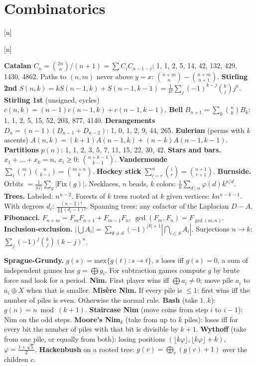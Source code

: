 \section{Combinatorics}

[n]

[n]

{\small
\textbf{Catalan} $C_n = \binom{2n}{n}/(n+1) = \sum C_i C_{n-1-i}$: 1, 1, 2, 5, 14, 42, 132, 429, 1430, 4862. Paths to $(n, m)$ never above $y = x$: $\binom{n+m}{n} - \binom{n+m}{n+1}$.
\textbf{Stirling 2nd} $S(n, k) = k S(n-1, k) + S(n-1, k-1) = \frac{1}{k!}\sum_j (-1)^{k-j}\binom{k}{j} j^n$. \textbf{Stirling 1st} (unsigned, cycles) $c(n, k) = (n-1)c(n-1, k) + c(n-1, k-1)$.
\textbf{Bell} $B_{n+1} = \sum_k \binom{n}{k} B_k$: 1, 1, 2, 5, 15, 52, 203, 877, 4140. \textbf{Derangements} $D_n = (n-1)(D_{n-1} + D_{n-2})$: 1, 0, 1, 2, 9, 44, 265.
\textbf{Eulerian} (perms with $k$ ascents) $A(n, k) = (k+1)A(n-1, k) + (n-k)A(n-1, k-1)$. \textbf{Partitions} $p(n)$: 1, 1, 2, 3, 5, 7, 11, 15, 22, 30, 42.
\textbf{Stars and bars.} $x_1 + \dots + x_k = n$, $x_i \ge 0$: $\binom{n+k-1}{k-1}$. \textbf{Vandermonde} $\sum_i \binom{m}{i}\binom{n}{k-i} = \binom{m+n}{k}$. \textbf{Hockey stick} $\sum_{i=r}^n \binom{i}{r} = \binom{n+1}{r+1}$.
\textbf{Burnside.} Orbits $= \frac{1}{|G|}\sum_g |\mathrm{Fix}(g)|$. Necklaces, $n$ beads, $k$ colors: $\frac{1}{n}\sum_{d \mid n}\varphi(d) k^{n/d}$.
\textbf{Trees.} Labeled: $n^{n-2}$. Forests of $k$ trees rooted at $k$ given vertices: $k n^{n-k-1}$. With degrees $d_i$: $\frac{(n-2)!}{\prod (d_i - 1)!}$. Spanning trees: any cofactor of the Laplacian $D - A$.
\textbf{Fibonacci.} $F_{n+m} = F_m F_{n+1} + F_{m-1} F_n$, $\gcd(F_m, F_n) = F_{\gcd(m, n)}$.
\textbf{Inclusion-exclusion.} $|\bigcup A_i| = \sum_{\emptyset \ne S} (-1)^{|S|+1} |\bigcap_{i \in S} A_i|$. Surjections $n \to k$: $\sum_j (-1)^j \binom{k}{j}(k-j)^n$.
\par}

{\small
\textbf{Sprague-Grundy.} $g(s) = \mathrm{mex}\{g(t) : s \to t\}$, $s$ loses iff $g(s) = 0$, a sum of independent games has $g = \bigoplus g_i$. For subtraction games compute $g$ by brute force and look for a period.
\textbf{Nim.} First player wins iff $\bigoplus a_i \ne 0$; move pile $a_i$ to $a_i \oplus X$ when that is smaller. \textbf{Mis\`ere Nim.} If every pile is $\le 1$: first wins iff the number of piles is even. Otherwise the normal rule.
\textbf{Bash} (take $1..k$): $g(n) = n \bmod (k+1)$. \textbf{Staircase Nim} (move coins from step $i$ to $i - 1$): Nim on the odd steps.
\textbf{Moore's Nim$_k$} (take from up to $k$ piles): loses iff for every bit the number of piles with that bit is divisible by $k + 1$.
\textbf{Wythoff} (take from one pile, or equally from both): losing positions $(\lfloor k\varphi \rfloor, \lfloor k\varphi \rfloor + k)$, $\varphi = \frac{1+\sqrt5}{2}$.
\textbf{Hackenbush} on a rooted tree: $g(v) = \bigoplus_{c} (g(c) + 1)$ over the children $c$.
\par}
